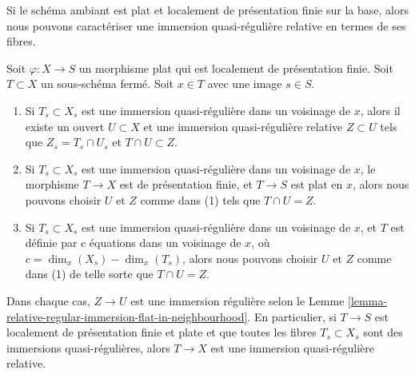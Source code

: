 \noindent
Si le schéma ambiant est plat et localement de présentation finie sur la base,
alors nous pouvons caractériser une immersion quasi-régulière relative en termes
de ses fibres.

\begin{lemma}
\label{lemma-fibre-quasi-regular}
Soit  $\varphi : X \to S$  un morphisme plat qui est localement de présentation finie. Soit
 $T \subset X$  un sous-schéma fermé. Soit  $x \in T$  avec une image  $s \in S$.
\begin{enumerate}
\item Si  $T_s \subset X_s$  est une immersion quasi-régulière dans un voisinage de
 $x$, alors il existe un ouvert  $U \subset X$  et une immersion
quasi-régulière relative  $Z \subset U$  tels que  $Z_s = T_s \cap U_s$  et  $T \cap U \subset Z$.
\item Si  $T_s \subset X_s$  est une immersion quasi-régulière dans un voisinage de
 $x$, le morphisme  $T \to X$  est de présentation finie, et  $T \to S$ 
est plat en  $x$, alors nous pouvons choisir  $U$  et  $Z$ 
comme dans (1) tels que  $T \cap U = Z$.
\item Si  $T_s \subset X_s$  est une immersion quasi-régulière dans un voisinage de
 $x$, et  $T$  est définie par  $c$  équations dans un
voisinage de  $x$, où  $c = \dim_x(X_s) - \dim_x(T_s)$, alors nous pouvons choisir
 $U$  et  $Z$  comme dans (1) de telle sorte que  $T \cap U = Z$.
\end{enumerate}
Dans chaque cas,  $Z \to U$  est une immersion régulière selon le Lemme
 \ref{lemma-relative-regular-immersion-flat-in-neighbourhood}. En particulier, si  $T \to S$  est localement de présentation finie
et plate et que toutes les fibres  $T_s \subset X_s$  sont des immersions
quasi-régulières, alors  $T \to X$  est une immersion quasi-régulière relative.
\end{lemma}

